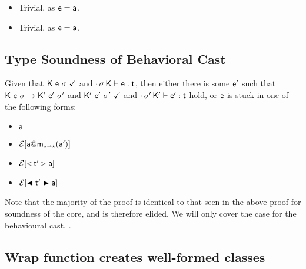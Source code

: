 \documentclass[acmlarge, anonymous, authordraft]{acmart}
\begin{document}
\begin{itemize}
  \item {}
  
      Trivial, as ${\sf{e}}={\sf{a}}$.
  
  \item {}
  
      Trivial, as ${\sf{e}}={\sf{a}}$.
\end{itemize}


\subsection{Type Soundness of \kafka Behavioral Cast}

Given that ${\sf{K}}~{\sf{e}}~\sigma~\checkmark$ and $\EnvType\cdot\s\K\e\t$, then either there is some ${{{\sf{e'}}}}$ 
such that ${{\sf{K}}}~{{\sf{e}}}~{\sigma} \rightarrow {{\ensuremath{{\sf{K'}}}}}~{{{{\sf{e'}}}}}~{{{\sigma'}}}$ and ${{\sf{K'}}}~{{{\sf{e'}}}}~{{\sigma'}}~\checkmark$ and $\EnvType\cdot\sp\Kp\ep\t$ hold, 
or ${\sf{e}}$ is stuck in one of the following forms:
\begin{itemize} 
\item ${\sf{a}}$
\item $\EE[\DynCall\a\m{\ap}]$
\item $\EE[\SubCast\tp\a]$
\item $\EE[\BehCast\tp\a]$
\end{itemize}

Note that the majority of the proof is identical to that seen in the above proof
for soundness of the \kafka core, and is therefore elided. We will only cover
the case for the \kafka behavioural cast, .

\subsection{Wrap function creates well-formed classes}
\end{document}
